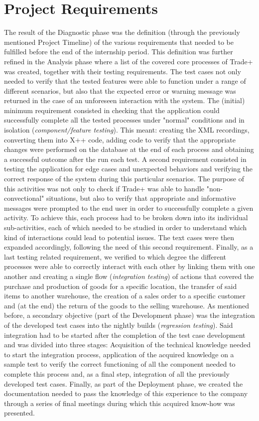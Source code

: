 \chapter{Project Requirements}

The result of the Diagnostic phase was the definition (through the previously mentioned Project Timeline) of the various requirements that needed to be fulfilled before the end of the internship period. This definition was further refined in the Analysis phase where a list of the covered core processes of Trade+ was created, together with their testing requirements. 
The test cases not only needed to verify that the tested features were able to function under a range of different scenarios, but also that the expected error or warning message was returned in the case of an unforeseen interaction with the system. 
The (initial) minimum  requirement consisted in checking that the application could successfully complete all the tested processes under "normal" conditions and in isolation (\textit{component/feature testing}). This meant: creating the XML recordings, converting them into X++ code, adding code to verify that the appropriate changes were performed on the database at the end of each process and obtaining a successful outcome after the run each test. 
A second requirement consisted in testing the application for edge cases and unexpected behaviors and verifying the correct response of the system during this particular scenarios. The purpose of this activities was not only to check if Trade+ was able to handle "non-convectional" situations, but also to verify that appropriate and informative messages were prompted to the end user in order to successfully complete a given activity. 
To achieve this, each process had to be broken down into its individual sub-activities, each of which needed to be studied in order to understand which kind of interactions could lead to potential issues. The text cases were then expanded accordingly, following the need of this second requirement. 
Finally, as a last testing related requirement, we verified to which degree the different processes were able to correctly interact with each other by linking them with one another and creating a single flow (\textit{integration testing}) of actions that covered the purchase and production of goods for a specific location, the transfer of said items to another warehouse, the creation of a sales order to a specific customer and (at the end) the return of the goods to the selling warehouse.
As mentioned before, a secondary objective (part of the Development phase) was the integration of the developed test cases into the nightly builds (\textit{regression testing}). Said integration had to be started after the completion of the test case development and was divided into three stages: Acquisition of the technical knowledge needed to start the integration process, application of the acquired knowledge on a sample test to verify the correct functioning of all the component needed to complete this process and, as a final step, integration of all the previously developed test cases. 
Finally, as part of the Deployment phase, we created the documentation needed to pass the knowledge of this experience to the company through a series of final meetings during which this acquired know-how was presented.